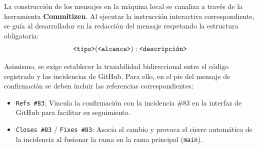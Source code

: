 La construcción de los mensajes en la máquina local se canaliza a través de la herramienta \textbf{Commitizen}. Al ejecutar la instrucción interactiva correspondiente, se guía al desarrollador en la redacción del mensaje respetando la estructura obligatoria:
\[
\text{\texttt{<tipo>}}(\text{\texttt{<alcance>}}): \text{\texttt{<descripción>}}
\]

\begin{table}[H]
\centering
\small
\renewcommand{\arraystretch}{1.5}
\caption{Tipos de \textit{commits} según Conventional Commits.}
\label{tab:tipos_commits}
\end{table}

Asimismo, se exige establecer la trazabilidad bidireccional entre el código registrado y las incidencias de GitHub. Para ello, en el pie del mensaje de confirmación se deben incluir las referencias correspondientes:

\begin{itemize}
    \item \texttt{Refs \#83}: Vincula la confirmación con la incidencia \#83 en la interfaz de GitHub para facilitar su seguimiento.
    \item \texttt{Closes \#83} / \texttt{Fixes \#83}: Asocia el cambio y provoca el cierre automático de la incidencia al fusionar la rama en la rama principal (\texttt{main}).
\end{itemize}

